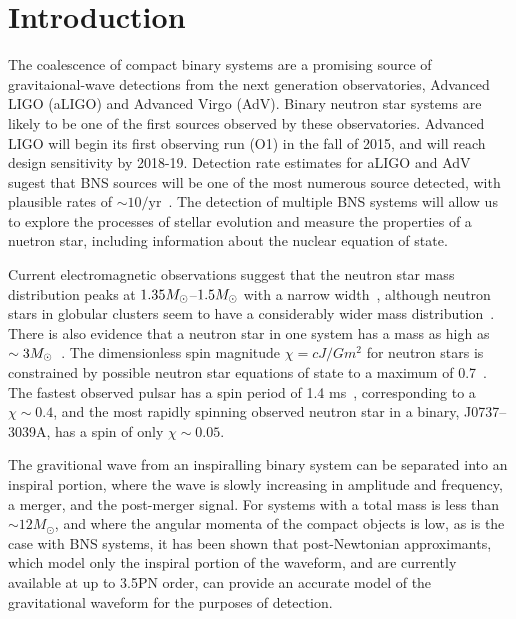 


\section{Introduction}
\label{sec:introduction}

The coalescence of compact binary systems are a promising source of gravitaional-wave detections from the next generation observatories, Advanced LIGO (aLIGO) and Advanced Virgo (AdV). Binary neutron star systems are likely to be one of the first sources observed by these observatories. Advanced LIGO will begin its first observing run (O1) in the fall of 2015, and will reach design sensitivity by 2018-19. Detection rate estimates for aLIGO and AdV sugest that BNS sources will be one of the most numerous source detected, with plausible
rates of $\sim 10/\mathrm{yr}$~\cite{Abadie:2010cf}. The detection of multiple BNS systems will allow us to explore the processes of stellar evolution and measure the properties of a nuetron star, including information about the nuclear equation of state\cite{lacky}.

Current electromagnetic observations suggest that the neutron star mass distribution peaks at $1.35 M_\odot$--$1.5 M_\odot$ with a narrow width~\cite{Kiziltan:2010ct}, although neutron stars in globular clusters seem to have a considerably wider mass distribution~\cite{Kiziltan:2010ct}. There is also evidence that a neutron star in one system has a mass as high as $\sim 3 M_\odot$~\cite{Freire:2007jd}. The dimensionless spin magnitude $\chi = cJ/Gm^2$ for neutron stars is constrained by possible neutron star equations of state to a maximum of 0.7~\cite{Lo:2010bj}.  The fastest observed pulsar has a spin period of 1.4 ms~\cite{Hessels:2006ze}, corresponding to a $\chi \sim 0.4$, and the most rapidly spinning observed neutron star in a binary, J0737--3039A, has a spin of only $\chi \sim 0.05$.  

The gravitional wave from an inspiralling binary system can be separated into an inspiral portion, where the wave is slowly increasing in amplitude and frequency, a merger, and the post-merger signal. For systems with a total mass is less than $\sim 12 M_\odot$, and where the angular momenta of the compact objects is low, as is the case with BNS systems, it has been shown that post-Newtonian approximants, which model only the inspiral portion of the waveform, and are currently available at up to 3.5PN order, can provide an accurate model of the gravitational waveform for the purposes of detection.

